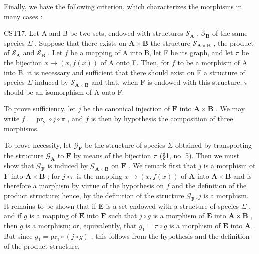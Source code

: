 Finally, we have the following criterion, which characterizes the morphisms in many cases :

CST17. Let A and B be two sets, endowed with structures \(\mathcal{S}_{\mathbf{A}}\) , \(\mathcal{S}_{\mathbf{B}}\) of the same species \(\Sigma\) . Suppose that there exists on \(\mathbf{A} \times \mathbf{B}\) the structure \(\mathcal{S}_{\mathbf{A} \times \mathbf{B}}\) , the product of \(\mathcal{S}_{\mathbf{A}}\) and \(\mathcal{S}_{\mathbf{B}}\) . Let \(f\) be a mapping of A into B, let F be its graph, and let \(\pi\) be the bijection \(x \to (x, f(x))\) of A onto F. Then, for \(f\) to be a morphism of A into B, it is necessary and sufficient that there should exist on F a structure of species \(\Sigma\) induced by \(\mathcal{S}_{\mathbf{A} \times \mathbf{B}}\) and that, when F is endowed with this structure, \(\pi\) should be an isomorphism of A onto F.

To prove sufficiency, let \(j\) be the canonical injection of \(\mathbf{F}\) into \(\mathbf{A} \times \mathbf{B}\) . We may write \(f = \operatorname{pr}_2 \circ j \circ \pi\) , and \(f\) is then by hypothesis the composition of three morphisms.

To prove necessity, let \(\mathcal{G}_{\mathbf{F}}\) be the structure of species \(\Sigma\) obtained by transporting the structure \(\mathcal{G}_{\mathbf{A}}\) to \(\mathbf{F}\) by means of the bijection \(\pi\) (§1, no. 5). Then we must show that \(\mathcal{G}_{\mathbf{F}}\) is induced by \(\mathcal{G}_{\mathbf{A} \times \mathbf{B}}\) on \(\mathbf{F}\) . We remark first that \(j\) is a morphism of \(\mathbf{F}\) into \(\mathbf{A} \times \mathbf{B}\) ; for \(j \circ \pi\) is the mapping \(x \to (x, f(x))\) of \(\mathbf{A}\) into \(\mathbf{A} \times \mathbf{B}\) and is therefore a morphism by virtue of the hypothesis on \(f\) and the definition of the product structure; hence, by the definition of the structure \(\mathcal{G}_{\mathbf{F}}, j\) is a morphism. It remains to be shown that if \(\mathbf{E}\) is a set endowed with a structure of species \(\Sigma\) , and if \(g\) is a mapping of \(\mathbf{E}\) into \(\mathbf{F}\) such that \(j \circ g\) is a morphism of \(\mathbf{E}\) into \(\mathbf{A} \times \mathbf{B}\) , then \(g\) is a morphism; or, equivalently, that \(g_{1} = \pi \circ g\) is a morphism of \(\mathbf{E}\) into \(\mathbf{A}\) . But since \(g_{1} = \mathrm{pr}_{1} \circ (j \circ g)\) , this follows from the hypothesis and the definition of the product structure.

